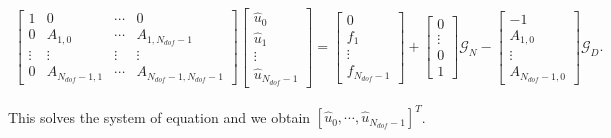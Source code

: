 \begin{eqnarray}
\begin{bmatrix}
    1       & 0         &\cdots     & 0   \\
    0       & A_{1,0}   &\cdots     & A_{1,N_{dof}-1}   \\
    \vdots  &\vdots     &\vdots     &\vdots        \\
    0       & A_{N_{dof}-1,1} &\cdots     & A_{N_{dof}-1,N_{dof}-1}
\end{bmatrix}
\begin{bmatrix}
    \hat u_0    \\
    \hat u_1    \\
    \vdots      \\
    \hat u_{N_{dof}-1}
\end{bmatrix}
=
\begin{bmatrix}
    0       \\
    f_1     \\
    \vdots  \\
    f_{N_{dof}-1}
\end{bmatrix}
+
\begin{bmatrix}
    0       \\
    \vdots  \\
    0       \\
    1
\end{bmatrix}
\mathcal{G}_N
-
\begin{bmatrix}
    -1       \\
    A_{1,0}  \\
    \vdots   \\
    A_{N_{dof}-1,0}
\end{bmatrix}
\mathcal{G}_D.
\end{eqnarray}

This solves the system of equation and we obtain $[\hat u_0, \cdots, \hat u_{N_{dof}-1}]^T$.
